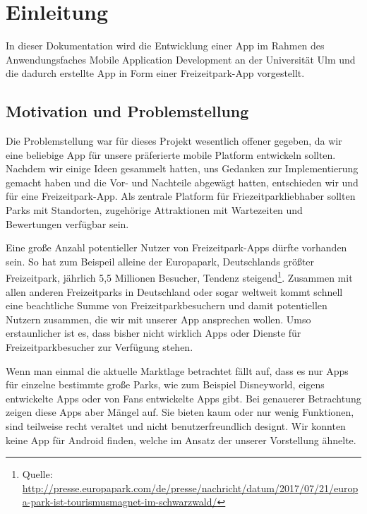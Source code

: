 \chapter{Einleitung}
\label{cha:einleitung}

In dieser Dokumentation wird die Entwicklung einer App im Rahmen des Anwendungsfaches Mobile Application Development an der Universität Ulm und die dadurch erstellte App in Form einer Freizeitpark-App vorgestellt.

\section{Motivation und Problemstellung}
\label{sec:einleitung:problemstellung}

Die Problemstellung war für dieses Projekt wesentlich offener gegeben, da wir eine beliebige App für unsere präferierte mobile Platform entwickeln sollten. Nachdem wir einige Ideen gesammelt hatten, uns Gedanken zur Implementierung gemacht haben und die Vor- und Nachteile abgewägt hatten, entschieden wir und für eine Freizeitpark-App. Als zentrale Platform für Friezeitparkliebhaber sollten Parks mit Standorten, zugehörige Attraktionen mit Wartezeiten und Bewertungen verfügbar sein. 

Eine große Anzahl potentieller Nutzer von Freizeitpark-Apps dürfte vorhanden sein. So hat zum Beispeil alleine der Europapark, Deutschlands größter Freizeitpark, jährlich 5,5 Millionen Besucher, Tendenz steigend\footnote{Quelle: \url{ http://presse.europapark.com/de/presse/nachricht/datum/2017/07/21/europa-park-ist-tourismusmagnet-im-schwarzwald/}}. Zusammen mit allen anderen Freizeitparks in Deutschland oder sogar weltweit kommt schnell eine beachtliche Summe von Freizeitparkbesuchern und damit potentiellen Nutzern zusammen, die wir mit unserer App ansprechen wollen. Umso erstaunlicher ist es, dass bisher nicht wirklich Apps oder Dienste für Freizeitparkbesucher zur Verfügung stehen.

Wenn man einmal die aktuelle Marktlage betrachtet fällt auf, dass es nur Apps für einzelne bestimmte große Parks, wie zum Beispiel Disneyworld, eigens entwickelte Apps oder von Fans entwickelte Apps gibt. Bei genauerer Betrachtung zeigen diese Apps aber Mängel auf. Sie bieten kaum oder nur wenig Funktionen, sind teilweise recht veraltet und nicht benutzerfreundlich designt. Wir konnten keine App für Android finden, welche im Ansatz der unserer Vorstellung ähnelte.

